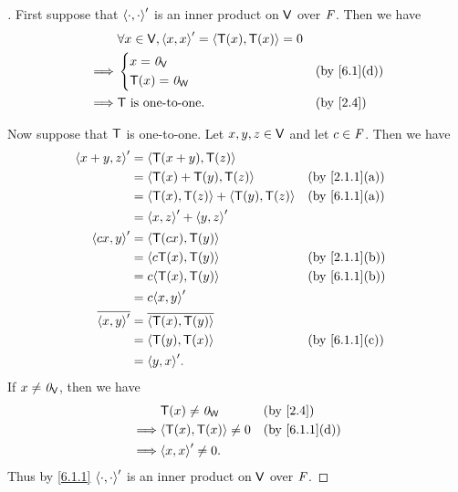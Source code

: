 \begin{proof}[]
	First suppose that \(\left\langle\cdot, \cdot\right\rangle'\) is an inner product on \(\mathsf{V}\) over \(\mathit{F}\).
	Then we have
	\begin{align*}
		         & \forall x \in \V, \inn{x, x}' = \inn{\T(x), \T(x)} = 0               \\
		\implies & \begin{dcases}
			           x = \zv_{\V} \\
			           \T(x) = \zv_{\W}
		           \end{dcases}                                       &  & \by{6.1}[d]  \\
		\implies & \T \text{ is one-to-one}.                              &  & \by{2.4}
	\end{align*}

	Now suppose that \(\mathsf{T}\) is one-to-one.
	Let \(x, y, z \in \mathsf{V}\) and let \(c \in \mathit{F}\).
	Then we have
	\begin{align*}
		\inn{x + y, z}'    & = \inn{\T(x + y), \T(z)}                                     \\
		                   & = \inn{\T(x) + \T(y), \T(z)}              &  & \by{2.1.1}[a] \\
		                   & = \inn{\T(x), \T(z)} + \inn{\T(y), \T(z)} &  & \by{6.1.1}[a] \\
		                   & = \inn{x, z}' + \inn{y, z}'                                  \\
		\inn{cx, y}'       & = \inn{\T(cx), \T(y)}                                        \\
		                   & = \inn{c \T(x), \T(y)}                    &  & \by{2.1.1}[b] \\
		                   & = c \inn{\T(x), \T(y)}                    &  & \by{6.1.1}[b] \\
		                   & = c \inn{x, y}'                                              \\
		\conj{\inn{x, y}'} & = \conj{\inn{\T(x), \T(y)}}                                  \\
		                   & = \inn{\T(y), \T(x)}                      &  & \by{6.1.1}[c] \\
		                   & = \inn{y, x}'.
	\end{align*}
	If \(x \neq \mathit{0}_{\mathsf{V}}\), then we have
	\begin{align*}
		         & \T(x) \neq \zv_{\W}       &  & \by{2.4}      \\
		\implies & \inn{\T(x), \T(x)} \neq 0 &  & \by{6.1.1}[d] \\
		\implies & \inn{x, x}' \neq 0.
	\end{align*}
	Thus by \cref{6.1.1} \(\left\langle\cdot, \cdot\right\rangle'\) is an inner product on \(\mathsf{V}\) over \(\mathit{F}\).
\end{proof}

